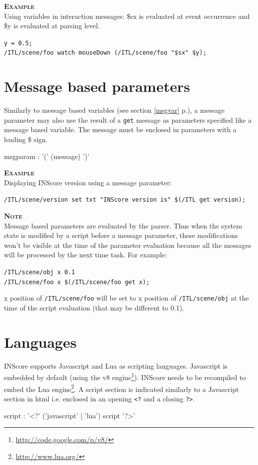 \documentclass[a4paper,twoside]{report}
\newcommand{\sublevel}[1]	{\section{#1}}
\newcommand{\fullref}[1]	{\ref{#1} p.\pageref{#1}}
\newcommand{\OSC}[1]		{\texttt{#1}}
\newcommand{\example}		{\textbf{\hspace{-1.5cm}\textbf{\textsc{Example }}}}
\newcommand{\note}	[1]		{\vspace{2mm}\textbf{\hspace{-1.03cm}\textbf{\textsc{Note #1}}}}
\newcommand{\sample}	[1]			{\vspace{-2mm}\begin{center}\colorbox{mygrey}{
								\begin{minipage}[t]{0.9\columnwidth} 
								{\small \texttt{#1}}
								\end{minipage}}\end{center}}
\begin{document}
\example \\
Using variables in interaction messages: \$sx is evaluated at event occurrence	and \$y is evaluated at parsing level.
\sample{y = 0.5;\\
/ITL/scene/foo watch mouseDown (/ITL/scene/foo "\$sx" \$y);
}


\sublevel{Message based parameters}\label{scriptmsgparam}

Similarly to message based variables (see section \fullref{msgvar}), a message parameter may also use the result of a \OSC{get} message as parameters specified like a message based variable.
The message must be enclosed in parameters with a leading \$ sign.
\begin{rail} 
msgparam : '(' (message) ')'
\end{rail}

\example \\
Displaying INScore version using a message parameter:
\sample{/ITL/scene/version set  txt "INScore version is" \$(/ITL get version);}

\note{}\\
Message based parameters are evaluated by the parser. Thus when the system state is modified by a script before a message parameter, these modifications won't be visible at the time of the parameter evaluation because all the messages will be processed by the next time task. For example:\\
\sample{/ITL/scene/obj x 0.1\\
/ITL/scene/foo x \$(/ITL/scene/foo get x);}
x position of \OSC{/ITL/scene/foo} will be set to x position of \OSC{/ITL/scene/obj} at the time of the script evaluation (that may be different to 0.1).

\sublevel{Languages}\label{scriptlang}


INScore supports Javascript and Lua as scripting languages. Javascript is embedded by default (using the v8 engine\footnote{\url{http://code.google.com/p/v8/}}). INScore needs to be recompiled to embed the Lua engine\footnote{\url{http://www.lua.org/}}. A script section is indicated similarly to a Javascript section in html i.e. enclosed in an opening \OSC{<?} and a closing \OSC{?>}.
\begin{rail} 
script : '<?' ('javascript' | 'lua') script '?>'
\end{rail}
\end{document}
